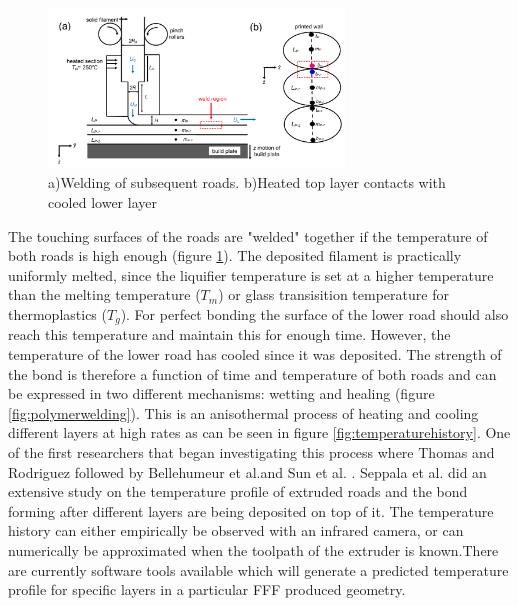\begin{figure}[H]
    \centering
    \includegraphics[width=0.7\textwidth]{chapter_2/figures/welding.png}
    \caption{a)Welding of subsequent roads. b)Heated top layer contacts with cooled lower layer \cite{McIlroy2017DeformationManufacturing}
    \label{fig:welding}}
\end{figure}

The touching surfaces of the roads are "welded" together if the temperature of both roads is high enough (figure \ref{fig:welding}). The deposited filament is practically uniformly melted, since the liquifier temperature is set at a higher temperature than the melting temperature ($T_m$) or glass transisition temperature for thermoplastics ($T_g$). For perfect bonding the surface of the lower road should also reach this temperature and maintain this for enough time. However, the temperature of the lower road has cooled since it was deposited. The strength of the bond is therefore a function of time and temperature of both roads and can be expressed in two different mechanisms: wetting and healing (figure \ref{fig:polymerwelding}). This is an anisothermal process of heating and cooling different layers at high rates as can be seen in figure \ref{fig:temperaturehistory}. One of the first researchers that began investigating this process where Thomas and Rodriguez \cite{Thomas2000ModelingRoads} followed by Bellehumeur et al.\cite{Bellehumeur2004ModelingProcess}and  Sun et al. \cite{Sun2008}. Seppala et al. \cite{Seppala2017WeldManufacturing} did an extensive study on the temperature profile of extruded roads and the bond forming after different layers are being deposited on top of it. The temperature history can either empirically be observed with an infrared camera, or can numerically be approximated when the toolpath of the extruder is known.There are currently software tools available which will generate a predicted temperature profile for specific layers in a particular FFF produced geometry\cite{Digimat-AM}. 

